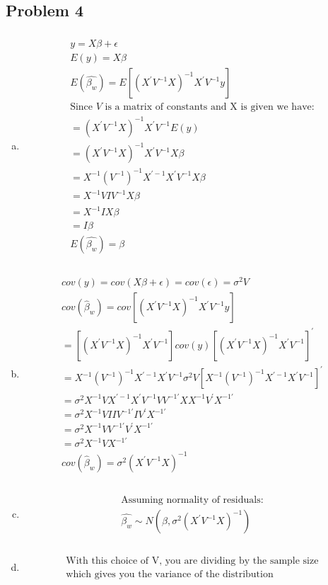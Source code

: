 \documentclass{article}
\begin{document}
\begin{flushleft}
	\section*{Problem 4}
\begin{enumerate}[(a)]
	\item 
\begin{multline*}\\
y=X\beta+\epsilon\\
E(y)=X\beta\\
E(\hat{\beta_w})=E[(X^{'}V^{-1}X)^{-1}X^{'}V^{-1}y]\\
\text{Since } V \text{ is a matrix of constants and X is given we have:}\\ 
=(X^{'}V^{-1}X)^{-1}X^{'}V^{-1}E(y)\\
=(X^{'}V^{-1}X)^{-1}X^{'}V^{-1}X\beta\\
=X^{-1}(V^{-1})^{-1}X^{'-1}X^{'}V^{-1}X\beta\\
=X^{-1}VIV^{-1}X\beta\\
=X^{-1}IX\beta\\
=I\beta\\
E(\hat{\beta_w})=\beta\\
\end{multline*}
	\item 
\begin{multline*}\\
cov(y)=cov(X\beta+\epsilon)=cov(\epsilon)=\sigma^2V\\
cov(\hat{\beta}_w)=cov[(X^{'}V^{-1}X)^{-1}X^{'}V^{-1}y]\\
=[(X^{'}V^{-1}X)^{-1}X^{'}V^{-1}]cov(y)[(X^{'}V^{-1}X)^{-1}X^{'}V^{-1}]^{'}\\
=X^{-1}(V^{-1})^{-1}X^{'-1}X^{'}V^{-1}\sigma^2V[X^{-1}(V^{-1})^{-1}X^{'-1}X^{'}V^{-1}]^{'}\\
=\sigma^2X^{-1}VX^{'-1}X^{'}V^{-1}VV^{-1'}XX^{-1}V^{'}X^{-1'}\\
=\sigma^2X^{-1}VIIV^{-1'}IV^{'}X^{-1'}\\
=\sigma^2X^{-1}VV^{-1'}V^{'}X^{-1'}\\
=\sigma^2X^{-1}VX^{-1'}\\
cov(\hat{\beta}_w)=\sigma^2(X^{'}V^{-1}X)^{-1}\\
\end{multline*}
	\item 
\begin{multline*}\\
\text{Assuming normality of residuals:}\\
\hat{\beta_w}\sim N(\beta,\sigma^2(X^{'}V^{-1}X)^{-1})\\
\end{multline*}
	\item 
\begin{multline*}\\
\text{With this choice of V, you are dividing by the sample size}\\
\text{which gives you the variance of the distribution}\\
\end{multline*}

\end{enumerate}

\end{flushleft}
\end{document}
